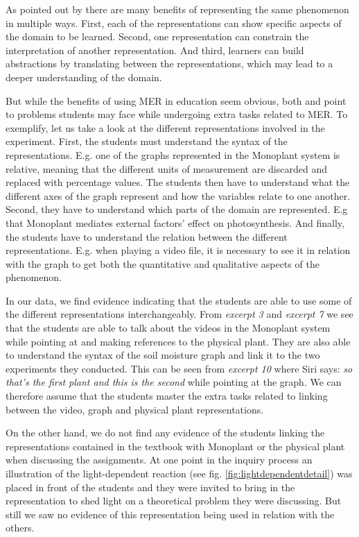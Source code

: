 As pointed out by \citet{van2006supporting} there are many benefits of representing the same phenomenon in multiple ways. First, each of the representations can show specific aspects of the domain to be learned. Second, one representation can constrain the interpretation of another representation. And third, learners can build abstractions by translating between the representations, which may lead to a deeper understanding of the domain. 

But while the benefits of using MER in education seem obvious, both \citet{ainsworth1999functions} and \citet{van2006supporting} point to problems students may face while undergoing extra tasks related to MER. To exemplify, let us take a look at the different representations involved in the experiment. First, the students must understand the syntax of the representations. E.g. one of the graphs represented in the Monoplant system is relative, meaning that the different units of measurement are discarded and replaced with percentage values. The students then have to understand what the different axes of the graph represent and how the variables relate to one another. Second, they have to understand which parts of the domain are represented. E.g that Monoplant mediates external factors' effect on photosynthesis. And finally, the students have to understand the relation between the different representations. E.g. when playing a video file, it is necessary to see it in relation with the graph to get both the quantitative and qualitative aspects of the phenomenon. 

In our data, we find evidence indicating that the students are able to use some of the different representations interchangeably. From \emph{excerpt 3} and \emph{excerpt 7} we see that the students are able to talk about the videos in the Monoplant system while pointing at and making references to the physical plant. They are also able to understand the syntax of the soil moisture graph and link it to the two experiments they conducted. This can be seen from \emph{excerpt 10} where Siri says: \emph{so that's the first plant and this is the second} while pointing at the graph. We can therefore assume that the students master the extra tasks related to linking between the video, graph and physical plant representations. 

On the other hand, we do not find any evidence of the students linking the representations contained in the textbook with Monoplant or the physical plant when discussing the assignments. At one point in the inquiry process an illustration of the light-dependent reaction (see fig. \ref{fig:lightdependentdetail}) was placed in front of the students and they were invited to bring in the representation to shed light on a theoretical problem they were discussing. But still we saw no evidence of this representation being used in relation with the others. 

